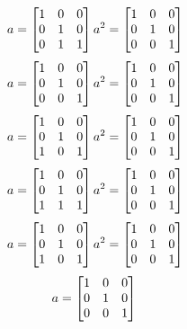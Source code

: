 \begin{mdframed}[style=darkAnswer,frametitle={Joe Starr}]
\begin{itemize}
{$$    $$
    $$a= \begin{bmatrix}1&0&0\\0&1&0\\0&1&1\end{bmatrix} \\
    a^{ 2 }={ \begin{bmatrix}1&0&0\\0&1&0\\0&0&1\end{bmatrix} }
    $$
    $$a= \begin{bmatrix}1&0&0\\0&1&0\\0&0&1\end{bmatrix} \\
    a^{ 2 }={ \begin{bmatrix}1&0&0\\0&1&0\\0&0&1\end{bmatrix} }
    $$
    $$a= \begin{bmatrix}1&0&0\\0&1&0\\1&0&1\end{bmatrix} \\
    a^{ 2 }={ \begin{bmatrix}1&0&0\\0&1&0\\0&0&1\end{bmatrix} }
    $$
    $$a= \begin{bmatrix}1&0&0\\0&1&0\\1&1&1\end{bmatrix} \\
    a^{ 2 }={ \begin{bmatrix}1&0&0\\0&1&0\\0&0&1\end{bmatrix} }
    $$
    $$a= \begin{bmatrix}1&0&0\\0&1&0\\1&0&1\end{bmatrix} \\
    a^{ 2 }={ \begin{bmatrix}1&0&0\\0&1&0\\0&0&1\end{bmatrix} }
    $$
    $$a= \begin{bmatrix}1&0&0\\0&1&0\\0&0&1\end{bmatrix} \\
$$}
\end{itemize}
\end{mdframed}
